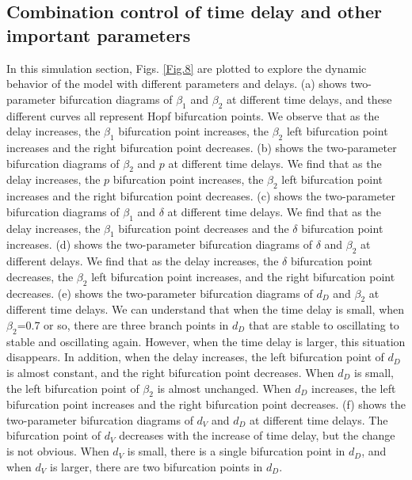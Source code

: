\documentclass{CMHPhD-SIVD}
\begin{document}
\subsection{Combination control of time delay and other important parameters}

In this simulation section, Figs. \ref{Fig.8} are plotted to explore the dynamic behavior of the model with different parameters and delays. 
(a) shows two-parameter bifurcation diagrams of $\beta_1$ and $\beta_2$ at different time delays, and these different curves all represent Hopf bifurcation points. We observe that as the delay increases, the $\beta_1$ bifurcation point increases, the $\beta_2$ left bifurcation point increases and the right bifurcation point decreases. (b) shows the two-parameter bifurcation diagrams of $\beta_2$ and $p$ at different time delays. We find that as the delay increases, the $p$ bifurcation point increases, the $\beta_2$ left bifurcation point increases and the right bifurcation point decreases. (c) shows the two-parameter bifurcation diagrams of $\beta_1$ and $\delta$ at different time delays. We find that as the delay increases, the $\beta_1$ bifurcation point decreases and the $\delta$ bifurcation point increases. (d) shows the two-parameter bifurcation diagrams of $\delta$ and $\beta_2$ at different delays. We find that as the delay increases, the $\delta$ bifurcation point decreases, the $\beta_2$ left bifurcation point increases, and the right bifurcation point decreases. (e) shows the two-parameter bifurcation diagrams of $d_D$ and $\beta_2$ at different time delays. We can understand that when the time delay is small, when $\beta_2$=0.7 or so, there are three branch points in $d_D$ that are stable to oscillating to stable and oscillating again. However, when the time delay is larger, this situation disappears. In addition, when the delay increases, the left bifurcation point of $d_D$ is almost constant, and the right bifurcation point decreases. When $d_D$ is small, the left bifurcation point of $\beta_2$ is almost unchanged. When $d_D$ increases, the left bifurcation point increases and the right bifurcation point decreases. (f) shows the two-parameter bifurcation diagrams of $d_V$ and $d_D$ at different time delays. The bifurcation point of $d_V$ decreases with the increase of time delay, but the change is not obvious. When $d_V$ is small, there is a single bifurcation point in $d_D$, and when $d_V$ is larger, there are two bifurcation points in $d_D$.
\end{document}
